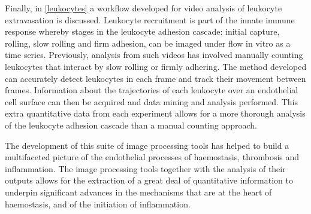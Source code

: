 Finally, in \autoref{leukocytes} a workflow developed for video analysis of leukocyte extravasation is discussed. Leukocyte recruitment is part of the innate immune response whereby stages in the leukocyte adhesion cascade: initial capture, rolling, slow rolling and firm adhesion, can be imaged under flow in vitro as a time series. Previously, analysis from such videos has involved manually counting leukocytes that interact by slow rolling or firmly adhering. The method developed can accurately detect leukocytes in each frame and track their movement between frames. Information about the trajectories of each leukocyte over an endothelial cell surface can then be acquired and data mining and analysis performed. This extra quantitative data from each experiment allows for a more thorough analysis of the leukocyte adhesion cascade than a manual counting approach.

The development of this suite of image processing tools has helped to build a multifaceted picture of the endothelial processes of haemostasis, thrombosis and inflammation. The image processing tools together with the analysis of their outputs allows for the extraction of a great deal of quantitative information to underpin significant advances in the mechanisms that are at the heart of haemostasis, and of the initiation of inflammation.
